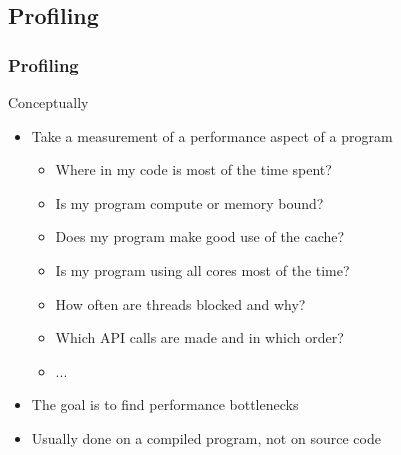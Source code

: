 \subsection[prof]{Profiling}

\begin{frame}[fragile]
  \frametitle{Profiling}
  \begin{block}{Conceptually}
    \begin{itemize}
      \item Take a measurement of a performance aspect of a program
      \begin{itemize}
        \item Where in my code is most of the time spent?
        \item Is my program compute or memory bound?
        \item Does my program make good use of the cache?
        \item Is my program using all cores most of the time?
        \item How often are threads blocked and why?
        \item Which API calls are made and in which order?
        \item ...
      \end{itemize}
      \item The goal is to find performance bottlenecks
      \item Usually done on a compiled program, not on source code
    \end{itemize}
  \end{block}
\end{frame}

